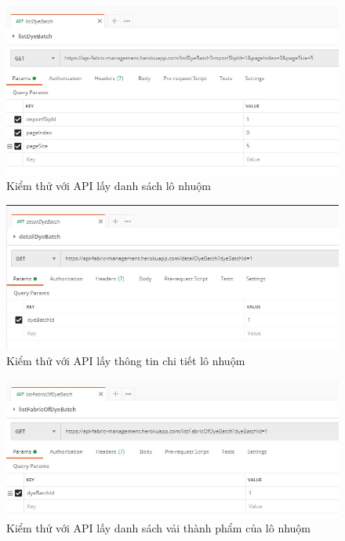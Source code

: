 \begin{figure}[H]
    \begin{center}
        \includegraphics[width=12cm]{Image/API/27_listDyeBatch.jpg}
        \caption{Kiểm thử với API lấy danh sách lô nhuộm}
        \label{listDyeBatch}
    \end{center}
\end{figure}
\begin{figure}[H]
    \begin{center}
        \includegraphics[width=12cm]{Image/API/28_detailDyeBatch.jpg}
        \caption{Kiểm thử với API lấy thông tin chi tiết lô nhuộm}
        \label{detailDyeBatch}
    \end{center}
\end{figure}
\begin{figure}[H]
    \begin{center}
        \includegraphics[width=12cm]{Image/API/29_listFabricOfDyeBatch.jpg}
        \caption{Kiểm thử với API lấy danh sách vải thành phẩm của lô nhuộm}
        \label{listFabricOfDyeBatch}
    \end{center}
\end{figure}


